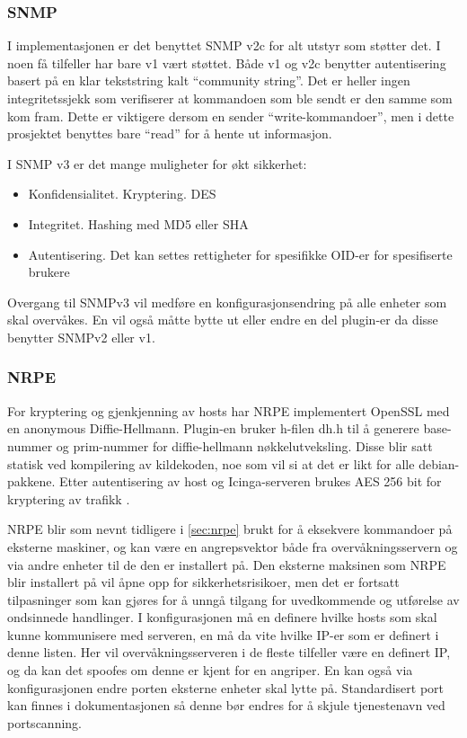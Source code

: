 \subsubsection{SNMP}
I implementasjonen er det benyttet SNMP v2c for alt utstyr som støtter det. I noen få tilfeller har bare v1 vært støttet. Både v1 og v2c benytter autentisering basert på en klar tekststring kalt “community string”. Det er heller ingen integritetssjekk som verifiserer at kommandoen som ble sendt er den samme som kom fram. Dette er viktigere dersom en sender “write-kommandoer”, men i dette prosjektet benyttes bare “read” for å hente ut informasjon.

I SNMP v3 er det mange muligheter for økt sikkerhet:
\begin{itemize}
	\item Konfidensialitet. Kryptering. DES
	\item Integritet. Hashing med MD5 eller SHA
	\item Autentisering. Det kan settes rettigheter for spesifikke OID-er for spesifiserte brukere
\end{itemize}
Overgang til SNMPv3 vil medføre en konfigurasjonsendring på alle enheter som skal overvåkes. En vil også måtte bytte ut eller endre en del plugin-er da disse benytter SNMPv2 eller v1.
\subsubsection{NRPE}
For kryptering og gjenkjenning av hosts har NRPE implementert OpenSSL med en anonymous Diffie-Hellmann. Plugin-en bruker h-filen dh.h til å generere base-nummer og prim-nummer for diffie-hellmann nøkkelutveksling. Disse blir satt statisk ved kompilering av kildekoden, noe som vil si at det er likt for alle debian-pakkene. Etter autentisering av host og Icinga-serveren brukes AES 256 bit for kryptering av trafikk \cite{nrpessl}.

NRPE blir som nevnt tidligere i \ref{sec:nrpe} brukt for å eksekvere kommandoer på eksterne maskiner, og kan være en angrepsvektor både fra overvåkningsservern og via andre enheter til de den er installert på. Den eksterne maksinen som NRPE blir installert på vil åpne opp for sikkerhetsrisikoer, men det er fortsatt tilpasninger som kan gjøres for å unngå tilgang for uvedkommende og utførelse av ondsinnede handlinger. I konfigurasjonen må en definere hvilke hosts som skal kunne kommunisere med serveren, en må da vite hvilke IP-er som er definert i denne listen. Her vil overvåkningsserveren  i de fleste tilfeller være en definert IP, og da kan det spoofes om denne er kjent for en angriper. En kan også via konfigurasjonen endre porten eksterne enheter skal lytte på. Standardisert port kan finnes i dokumentasjonen så denne bør endres for å skjule tjenestenavn ved portscanning.

